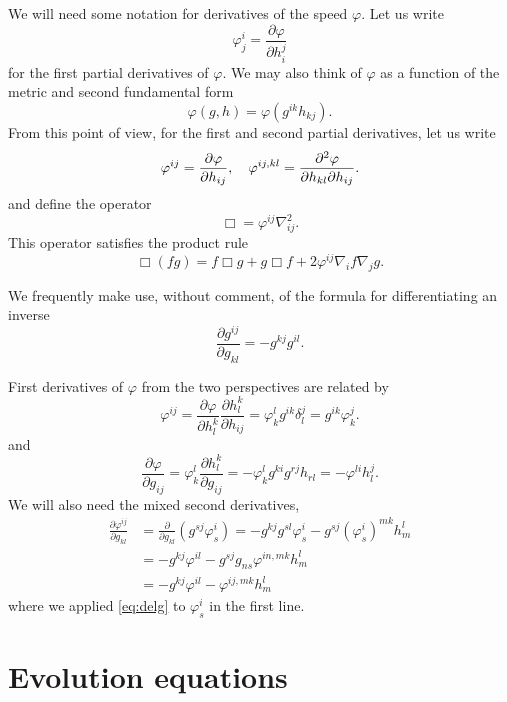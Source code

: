 \documentclass{amsart}
\begin{document}
We will need some notation for derivatives of the speed \(\varphi\). Let us write
\[
\varphi^{i}_{j} = \frac{\partial \varphi}{\partial h^{j}_{i}}
\]
for the first partial derivatives of \(\varphi\). We may also think of \(\varphi\) as a function of the metric and second fundamental form
\[
\varphi(g, h) = \varphi(g^{ik} h_{kj}).
\]
From this point of view, for the first and second partial derivatives, let us write
\[
\varphi^{ij} = \frac{\partial\varphi}{\partial h_{ij}}, \quad \varphi^{ij,kl} = \frac{\partial^2\varphi}{\partial h_{kl} \partial h_{ij}}.
\]
and define the operator
\[
\Box = \varphi^{ij} \nabla^2_{ij}.
\]
This operator satisfies the product rule
\begin{equation}
\label{eq:productbox}
\Box (fg) = f \Box g + g \Box f + 2 \varphi^{ij} \nabla_i f \nabla_j g.
\end{equation}

We frequently make use, without comment, of the formula for differentiating an inverse
\[
\frac{\partial g^{ij}}{\partial g_{kl}} = - g^{kj} g^{il}.
\]

First derivatives of \(\varphi\) from the two perspectives are related by
\begin{equation}
\label{eq:delh}
\varphi^{ij} = \frac{\partial \varphi}{\partial h_l^k} \frac{\partial h_l^k}{\partial h_{ij}} = \varphi^l_k g^{ik} \delta^j_l = g^{ik} \varphi^j_k.
\end{equation}
and
\begin{equation}
\label{eq:delg}
\frac{\partial\varphi}{\partial g_{ij}} = \varphi^{l}_{k} \frac{\partial h^{k}_{l}}{\partial g_{ij}} = -\varphi^{l}_{k} g^{ki} g^{rj} h_{rl} = -\varphi^{li}h^{j}_{l}.
\end{equation}
We will also need the mixed second derivatives,
\begin{equation}
\label{eq:delhdelg}
\begin{split}
\frac{\partial \varphi^{ij}}{\partial g_{kl}} &= \frac{\partial}{\partial g_{kl}} \left(g^{sj} \varphi^{i}_{s} \right) = - g^{kj}g^{sl} \varphi^{i}_{s} - g^{sj} (\varphi^i_s)^{mk} h^l_m \\
&= - g^{kj} \varphi^{il} - g^{sj} g_{ns} \varphi^{in,mk} h^l_m \\
&= - g^{kj} \varphi^{il} - \varphi^{ij,mk} h^l_m
\end{split}
\end{equation}
where we applied \cref{eq:delg} to \(\varphi^i_s\) in the first line.

\section{Evolution equations}
\end{document}
